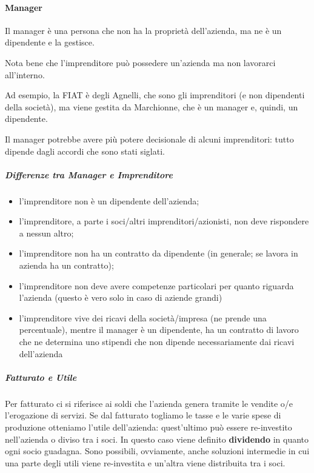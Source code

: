\paragraph*{Manager}
\begin{definition}[Manager]
Il manager è una persona che non ha la proprietà dell'azienda, ma ne è un
dipendente e la gestisce.
\end{definition}

\noindent Nota bene che l'imprenditore  può possedere un'azienda ma non
lavorarci all'interno.
\begin{example}[FIAT]
Ad esempio, la FIAT è degli Agnelli, che sono gli imprenditori (e non
dipendenti della società), ma viene gestita da Marchionne, che è un manager e,
quindi, un dipendente.
\end{example}

\noindent Il manager potrebbe avere più potere decisionale di alcuni
imprenditori: tutto dipende dagli accordi che sono stati siglati.

\subparagraph*{Differenze tra Manager e Imprenditore}
\begin{itemize}
  \item l'imprenditore non è un dipendente dell'azienda;
  \item l'imprenditore, a parte i soci/altri imprenditori/azionisti, non deve
rispondere a nessun altro;
  \item l'imprenditore non ha un contratto da dipendente (in generale; se
  lavora in azienda ha un contratto);
  \item l'imprenditore non deve avere competenze particolari per quanto riguarda
l'azienda (questo è vero solo in caso di aziende grandi)
  \item l'imprenditore vive dei ricavi della società/impresa (ne prende una
percentuale), mentre il manager è un dipendente, ha un contratto di lavoro che
ne determina uno stipendi che non dipende necessariamente dai ricavi
dell'azienda
\end{itemize}

\subparagraph*{Fatturato e Utile} Per fatturato ci si riferisce ai soldi che
l'azienda genera tramite le vendite o/e l'erogazione di servizi. Se dal
fatturato togliamo le tasse e le varie spese di produzione otteniamo l'utile
dell'azienda: quest'ultimo può essere re-investito nell'azienda o diviso tra
i soci. In questo caso viene definito \textbf{dividendo} in quanto ogni socio
guadagna. Sono possibili, ovviamente, anche soluzioni intermedie in cui una
parte degli utili viene re-investita e un'altra viene distribuita tra i soci.
